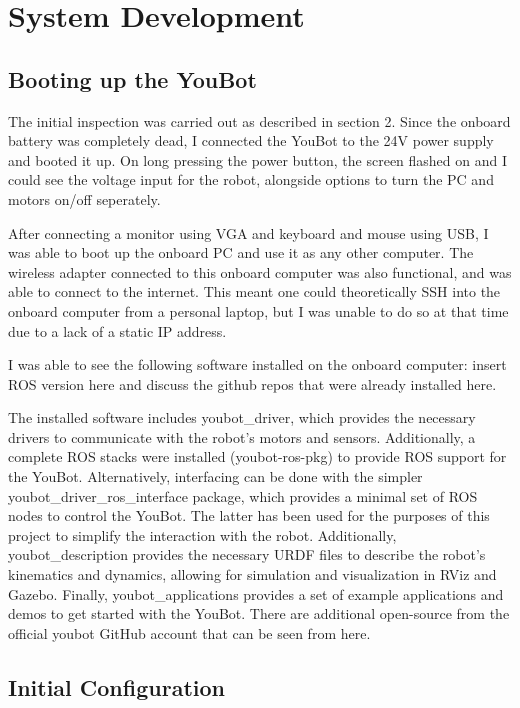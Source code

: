 \documentclass[a4paper, 12pt]{article}
\newif\ifshownotes
\newcommand{\notes}[1]{\ifshownotes\textcolor{blue}{#1}\fi}
\begin{document}
    \pagebreak

    \section{System Development}
    \subsection{Booting up the YouBot}

    The initial inspection was carried out as described in section 2. Since the onboard battery was completely dead, I connected the YouBot to the 24V power supply and booted it up. On long pressing the power button, the screen flashed on and I could see the voltage input for the robot, alongside options to turn the PC and motors on/off seperately. 

    After connecting a monitor using VGA and keyboard and mouse using USB, I was able to boot up the onboard PC and use it as any other computer. The wireless adapter connected to this onboard computer was also functional, and was able to connect to the internet. This meant one could theoretically SSH into the onboard computer from a personal laptop, but I was unable to do so at that time due to a lack of a static IP address.
    
    I was able to see the following software installed on the onboard computer: insert ROS version here and discuss the github repos that were already installed here. 

    The installed software includes youbot\_driver, which provides the necessary drivers to communicate with the robot's motors and sensors. Additionally, a complete ROS stacks were installed (youbot-ros-pkg) to provide ROS support for the YouBot. Alternatively, interfacing can be done with the simpler youbot\_driver\_ros\_interface package, which provides a minimal set of ROS nodes to control the YouBot. The latter has been used for the purposes of this project to simplify the interaction with the robot. Additionally, youbot\_description provides the necessary URDF files to describe the robot's kinematics and dynamics, allowing for simulation and visualization in RViz and Gazebo. Finally, youbot\_applications provides a set of example applications and demos to get started with the YouBot. There are additional open-source from the official youbot GitHub account that can be seen from here.  

    
    \notes{insert pictures showing failed stuff}
    \subsection{Initial Configuration}
\end{document}
